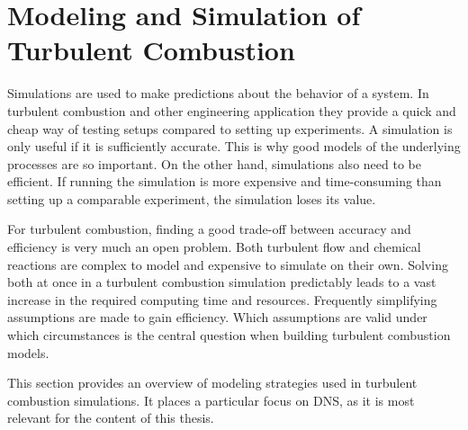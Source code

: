 \section{Modeling and Simulation of Turbulent Combustion} %
\label{sec:simulation_of_turbulent_combustion}
%
Simulations are used to make predictions about the behavior of a system.
%
In turbulent combustion and other engineering application they provide a
quick and cheap way of testing setups compared to setting up experiments.
%
A simulation is only useful if it is sufficiently accurate.
%
This is why good models of the underlying processes are so important.
%
On the other hand, simulations also need to be efficient.
%
If running the simulation is more expensive and time-consuming than setting up
a comparable experiment, the simulation loses its value.
%

%
For turbulent combustion, finding a good trade-off between accuracy and
efficiency is very much an open problem.
%
Both turbulent flow and chemical reactions are complex to model and expensive
to simulate on their own.
%
Solving both at once in a turbulent combustion simulation predictably leads to
a vast increase in the required computing time and resources.
%
Frequently simplifying assumptions are made to gain efficiency.
%
Which assumptions are valid under which circumstances is the central question
when building turbulent combustion models.
%

%
This section provides an overview of modeling strategies used in turbulent
combustion simulations.
%
It places a particular focus on \acl{DNS}, as it is most relevant for the
content of this thesis.
%
